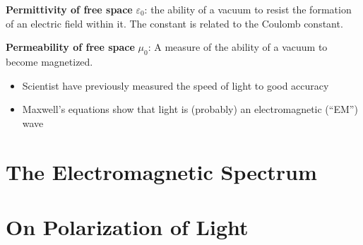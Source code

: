 \begin{definition}
  \textbf{Permittivity of free space} $\varepsilon_0$: the ability of a
  vacuum to resist the formation of an electric field within it. The
  constant is related to the Coulomb constant.
\end{definition}

\begin{definition}
  \textbf{Permeability of free space} $\mu_0$: A measure of the ability
  of a vacuum to become magnetized.
\end{definition}
\begin{itemize}
\item Scientist have previously measured the speed of light to good accuracy
\item Maxwell's equations show that light is (probably) an electromagnetic
  (``EM'') wave
\end{itemize}
%
%
%
%
\section{The Electromagnetic Spectrum}
\begin{figure}[ht]
  \centering
\end{figure}
%
%
%
%
%
\section{On Polarization of Light}
%

